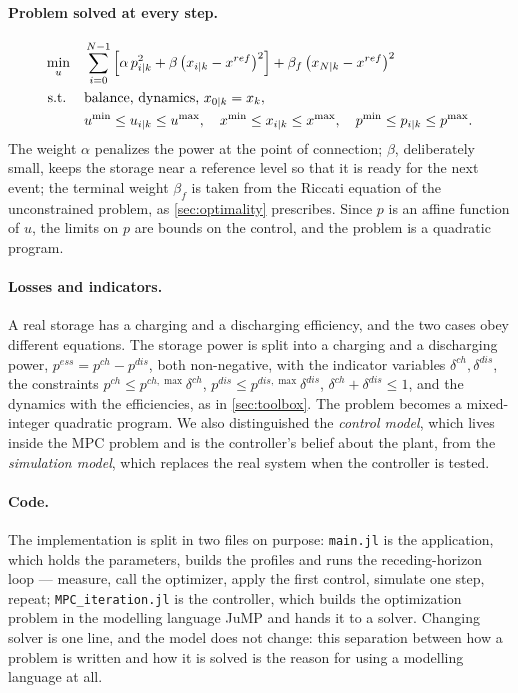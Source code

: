\paragraph{Problem solved at every step.}
\begin{equation}
\begin{aligned}
  \min_{u} \quad & \sum_{i=0}^{N-1}\Big[\alpha\, p_{{i|k}}^2 + \beta\,\big(x_{{i|k}} - x^{ref}\big)^2\Big]
                   + \beta_f\,\big(x_{{N|k}} - x^{ref}\big)^2 \\
  \text{s.t.}\; \quad & \text{balance, dynamics, } x_{{0|k}} = x_k, \\
            & u^{\min} \le u_{{i|k}} \le u^{\max},\quad x^{\min} \le x_{{i|k}} \le x^{\max},\quad
              p^{\min} \le p_{{i|k}} \le p^{\max}.
\end{aligned}
\end{equation}
The weight $\alpha$ penalizes the power at the point of connection; $\beta$, deliberately
small, keeps the storage near a reference level so that it is ready for the next event; the
terminal weight $\beta_f$ is taken from the Riccati equation of the unconstrained problem, as
\cref{sec:optimality} prescribes. Since $p$ is an affine function of $u$, the limits on $p$ are
bounds on the control, and the problem is a quadratic program.

\paragraph{Losses and indicators.} A real storage has a charging and a discharging efficiency,
and the two cases obey different equations. The storage power is split into a charging and a
discharging power, $p^{ess} = p^{ch} - p^{dis}$, both non-negative, with the indicator variables
$\delta^{ch}, \delta^{dis}$, the constraints $p^{ch} \le p^{ch,\max}\delta^{ch}$, $p^{dis} \le
p^{dis,\max}\delta^{dis}$, $\delta^{ch} + \delta^{dis} \le 1$, and the dynamics with the
efficiencies, as in \cref{sec:toolbox}. The problem becomes a mixed-integer quadratic program.
We also distinguished the \emph{control model}, which lives inside the MPC problem and is the
controller's belief about the plant, from the \emph{simulation model}, which replaces the real
system when the controller is tested.

\paragraph{Code.} The implementation is split in two files on purpose: \texttt{main.jl} is the
application, which holds the parameters, builds the profiles and runs the receding-horizon loop
--- measure, call the optimizer, apply the first control, simulate one step, repeat;
\texttt{MPC\_iteration.jl} is the controller, which builds the optimization problem in the
modelling language JuMP and hands it to a solver. Changing solver is one line, and the model
does not change: this separation between how a problem is written and how it is solved is the
reason for using a modelling language at all.

